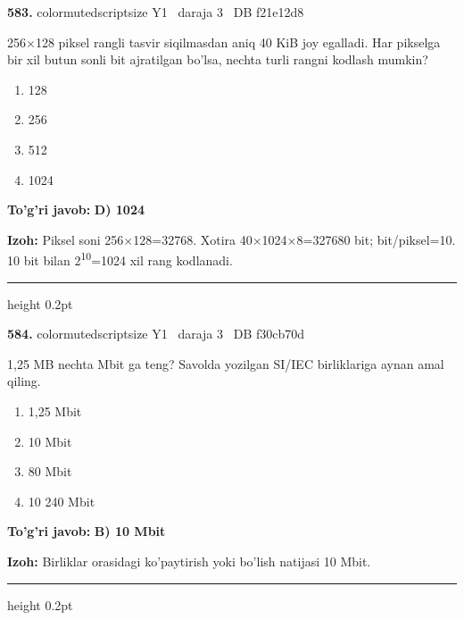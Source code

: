 \documentclass[10pt,a4paper,oneside]{article}
\begin{document}
\noindent\textbf{\color{ink}583.}  {color{muted}scriptsize Y1 \textbullet\ daraja 3 \textbullet\ DB f21e12d8}
\par
256\ensuremath{\times}128 piksel rangli tasvir siqilmasdan aniq 40 KiB joy egalladi. Har pikselga bir xil butun sonli bit ajratilgan bo'lsa, nechta turli rangni kodlash mumkin?
\begin{enumerate}[label=\Alph*),leftmargin=9mm]
\item 128
\item 256
\item 512
\item 1024
\end{enumerate}
\begin{tcolorbox}[enhanced,breakable,colback=teal!4,colframe=teal!50!black,boxrule=0.5pt,arc=1.1mm,left=3mm,right=3mm,top=1.7mm,bottom=1.7mm,before skip=2mm,after skip=2mm]
\textbf{\color{teal}To'g'ri javob:} \textbf{D) 1024}
\par\smallskip
\textbf{Izoh:} Piksel soni 256\ensuremath{\times}128=32768. Xotira 40\ensuremath{\times}1024\ensuremath{\times}8=327680 bit; bit/piksel=10. 10 bit bilan 2\textsuperscript{1}\textsuperscript{0}=1024 xil rang kodlanadi.
\end{tcolorbox}
\vspace{2mm}\hrule height 0.2pt \vspace{3mm}

\noindent\textbf{\color{ink}584.}  {color{muted}scriptsize Y1 \textbullet\ daraja 3 \textbullet\ DB f30cb70d}
\par
1,25 MB nechta Mbit ga teng? Savolda yozilgan SI/IEC birliklariga aynan amal qiling.
\begin{enumerate}[label=\Alph*),leftmargin=9mm]
\item 1,25 Mbit
\item 10 Mbit
\item 80 Mbit
\item 10 240 Mbit
\end{enumerate}
\begin{tcolorbox}[enhanced,breakable,colback=teal!4,colframe=teal!50!black,boxrule=0.5pt,arc=1.1mm,left=3mm,right=3mm,top=1.7mm,bottom=1.7mm,before skip=2mm,after skip=2mm]
\textbf{\color{teal}To'g'ri javob:} \textbf{B) 10 Mbit}
\par\smallskip
\textbf{Izoh:} Birliklar orasidagi ko'paytirish yoki bo'lish natijasi 10 Mbit.
\end{tcolorbox}
\vspace{2mm}\hrule height 0.2pt \vspace{3mm}
\end{document}

